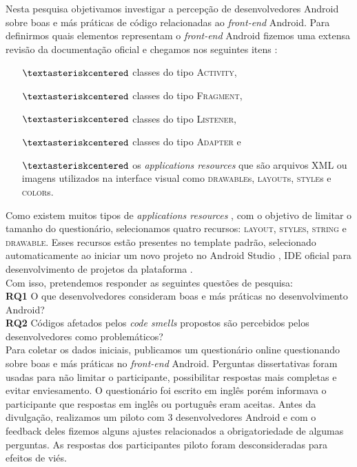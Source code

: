 Nesta pesquisa objetivamos investigar a percep\c{c}\~ao de desenvolvedores Android sobre boas e m\'as pr\'aticas de c\'odigo relacionadas ao \textit{front-end} Android. Para definirmos quais elementos representam o \textit{front-end} Android fizemos uma extensa revis\~ao da documenta\c{c}\~ao oficial e chegamos nos seguintes itens \cite{AndroidDeveloperSite2016}:

\begin{itemize} 
	\item[$\textasteriskcentered$] classes do tipo \textsc{Activity},
	\item[$\textasteriskcentered$] classes do tipo \textsc{Fragment},
	\item[$\textasteriskcentered$] classes do tipo \textsc{Listener}, 
	\item[$\textasteriskcentered$] classes do tipo \textsc{Adapter} e
	\item[$\textasteriskcentered$] os \textit{applications resources} que s\~ao arquivos XML ou imagens utilizados na interface visual como \textsc{drawable}s, \textsc{layout}s, \textsc{style}s e \textsc{color}s.
\end{itemize}

Como existem muitos tipos de \textit{applications resources} \cite{AndroidResourcesOverview}, com o objetivo de limitar o tamanho do question\'ario, selecionamos quatro recursos: \textsc{layout}, \textsc{styles}, \textsc{string} e \textsc{drawable}. Esses recursos est\~ao presentes no template padr\~ao, selecionado automaticamente ao iniciar um novo projeto no Android Studio \cite{FirstApp2017}, IDE oficial para desenvolvimento de projetos da plataforma \cite{AndroidStudio}. \\

Com isso, pretendemos responder as seguintes quest\~oes de pesquisa: \\

\textbf{RQ1} O que desenvolvedores consideram boas e m\'as pr\'aticas no desenvolvimento Android? \\

\textbf{RQ2} C\'odigos afetados pelos \textit{code smells} propostos s\~ao percebidos pelos desenvolvedores como problem\'aticos? \\


Para coletar os dados iniciais, publicamos um question\'ario online questionando sobre boas e m\'as pr\'aticas no \textit{front-end} Android. Perguntas dissertativas foram usadas para n\~ao limitar o participante, possibilitar respostas mais completas e evitar enviesamento. O question\'ario foi escrito em ingl\^es por\'em informava o participante que respostas em ingl\^es ou portugu\^es eram aceitas. Antes da divulga\c{c}\~ao, realizamos um piloto com 3 desenvolvedores Android e com o feedback deles fizemos alguns ajustes relacionados a obrigatoriedade de algumas perguntas. As respostas dos participantes piloto foram desconsideradas para efeitos de vi\'es. 

